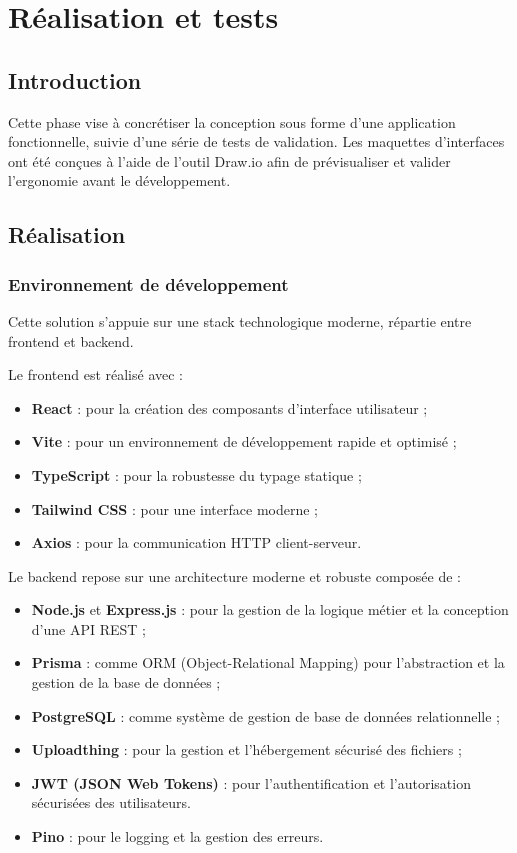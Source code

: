 \chapter{Réalisation et tests}

\section{Introduction}
Cette phase vise à concrétiser la conception sous forme d'une application fonctionnelle, suivie d'une série de tests de validation. Les maquettes d'interfaces ont été conçues à l'aide de l'outil Draw.io afin de prévisualiser et valider l'ergonomie avant le développement.

\section{Réalisation}
\subsection{Environnement de développement}
Cette solution s'appuie sur une stack technologique moderne, répartie entre frontend et backend.

Le frontend est réalisé avec :
\begin{itemize}
  \item \textbf{React} : pour la création des composants d'interface utilisateur ;
  \item \textbf{Vite} : pour un environnement de développement rapide et optimisé ;
  \item \textbf{TypeScript} : pour la robustesse du typage statique ;
  \item \textbf{Tailwind CSS} : pour une interface moderne  ;
  \item \textbf{Axios} : pour la communication HTTP client-serveur.
\end{itemize}

Le backend repose sur une architecture moderne et robuste composée de :
\begin{itemize}
  \item \textbf{Node.js} et \textbf{Express.js} : pour la gestion de la logique métier et la conception d'une API REST ;
  \item \textbf{Prisma} : comme ORM (Object-Relational Mapping) pour l'abstraction et la gestion de la base de données ;
  \item \textbf{PostgreSQL} : comme système de gestion de base de données relationnelle ;
  \item \textbf{Uploadthing} : pour la gestion et l'hébergement sécurisé des fichiers ;
  \item \textbf{JWT (JSON Web Tokens)} : pour l'authentification et l'autorisation sécurisées des utilisateurs.
  \item \textbf{Pino} : pour le logging et la gestion des erreurs.
\end{itemize}


